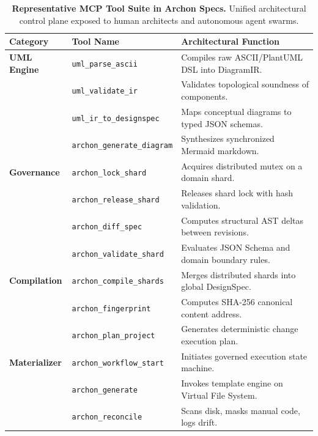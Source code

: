 \begin{table}[t]
  \centering
  \small
  \caption{\textbf{Representative MCP Tool Suite in Archon Specs.} Unified architectural control plane exposed to human architects and autonomous agent swarms.}
  \label{tab:mcp_tools}
  \begin{tabular}{llp{9.5cm}}
    \toprule
    \textbf{Category} & \textbf{Tool Name} & \textbf{Architectural Function} \\
    \midrule
    \textbf{UML Engine} & \texttt{uml\_parse\_ascii} & Compiles raw ASCII/PlantUML DSL into DiagramIR. \\
                        & \texttt{uml\_validate\_ir} & Validates topological soundness of components. \\
                        & \texttt{uml\_ir\_to\_designspec} & Maps conceptual diagrams to typed JSON schemas. \\
                        & \texttt{archon\_generate\_diagram} & Synthesizes synchronized Mermaid markdown. \\
    \midrule
    \textbf{Governance} & \texttt{archon\_lock\_shard} & Acquires distributed mutex on a domain shard. \\
                        & \texttt{archon\_release\_shard} & Releases shard lock with hash validation. \\
                        & \texttt{archon\_diff\_spec} & Computes structural AST deltas between revisions. \\
                        & \texttt{archon\_validate\_shard}& Evaluates JSON Schema and domain boundary rules. \\
    \midrule
    \textbf{Compilation} & \texttt{archon\_compile\_shards} & Merges distributed shards into global DesignSpec. \\
                        & \texttt{archon\_fingerprint} & Computes SHA-256 canonical content address. \\
                        & \texttt{archon\_plan\_project} & Generates deterministic change execution plan. \\
    \midrule
    \textbf{Materializer} & \texttt{archon\_workflow\_start}& Initiates governed execution state machine. \\
                          & \texttt{archon\_generate} & Invokes template engine on Virtual File System. \\
                          & \texttt{archon\_reconcile} & Scans disk, masks manual code, logs drift. \\
    \bottomrule
  \end{tabular}
\end{table}

